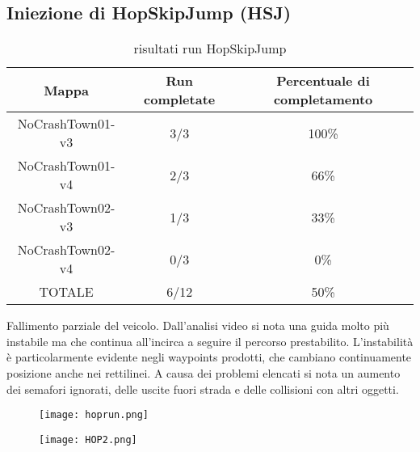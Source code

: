 \subsection{Iniezione di HopSkipJump (HSJ)}
\begin{table}[h!]
    \begin{tabular}{|c|c|c|}
        \hline
        Mappa                   & Run completate & Percentuale di completamento\\
        \hline
        NoCrashTown01-v3        & 3/3            & 100\% \\
        NoCrashTown01-v4        & 2/3            & 66\% \\
        NoCrashTown02-v3        & 1/3            & 33\% \\
        NoCrashTown02-v4        & 0/3            & 0\%  \\
        TOTALE                  & 6/12           & 50\% \\
        \hline
    \end{tabular}
    \caption{risultati run HopSkipJump}
    \label{tab:hsj}
\end{table}
 Fallimento parziale del veicolo. Dall'analisi video si nota una guida molto più instabile ma che continua all'incirca
a seguire il percorso prestabilito. L'instabilità è particolarmente evidente negli waypoints prodotti, che cambiano continuamente posizione anche nei rettilinei. A causa dei problemi elencati
si nota un aumento dei semafori ignorati, delle uscite fuori strada e delle collisioni con altri oggetti.
\begin{figure}[h]
    \centering
    \parbox{6cm}{
    \texttt{[image: hoprun.png]}
    \label{fig:hop1}}
    \qquad
    \begin{minipage}{6cm}
    \texttt{[image: HOP2.png]}
    \label{fig:hop2}
    \end{minipage}
    \label{fig:hoprun}
    \end{figure}
